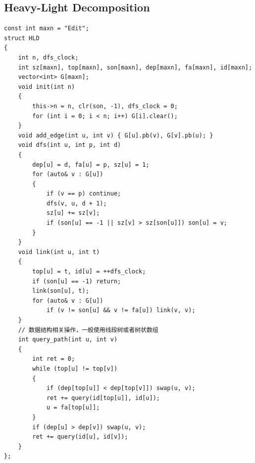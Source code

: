 \documentclass[twoside]{article}
\begin{document}
\subsection{Heavy-Light Decomposition}
\begin{lstlisting}
const int maxn = "Edit";
struct HLD
{
    int n, dfs_clock;
    int sz[maxn], top[maxn], son[maxn], dep[maxn], fa[maxn], id[maxn];
    vector<int> G[maxn];
    void init(int n)
    {
        this->n = n, clr(son, -1), dfs_clock = 0;
        for (int i = 0; i < n; i++) G[i].clear();
    }
    void add_edge(int u, int v) { G[u].pb(v), G[v].pb(u); }
    void dfs(int u, int p, int d)
    {
        dep[u] = d, fa[u] = p, sz[u] = 1;
        for (auto& v : G[u])
        {
            if (v == p) continue;
            dfs(v, u, d + 1);
            sz[u] += sz[v];
            if (son[u] == -1 || sz[v] > sz[son[u]]) son[u] = v;
        }
    }
    void link(int u, int t)
    {
        top[u] = t, id[u] = ++dfs_clock;
        if (son[u] == -1) return;
        link(son[u], t);
        for (auto& v : G[u])
            if (v != son[u] && v != fa[u]) link(v, v);
    }
    // 数据结构相关操作，一般使用线段树或者树状数组
    int query_path(int u, int v)
    {
        int ret = 0;
        while (top[u] != top[v])
        {
            if (dep[top[u]] < dep[top[v]]) swap(u, v);
            ret += query(id[top[u]], id[u]);
            u = fa[top[u]];
        }
        if (dep[u] > dep[v]) swap(u, v);
        ret += query(id[u], id[v]);
    }
};
\end{lstlisting}
\end{document}
